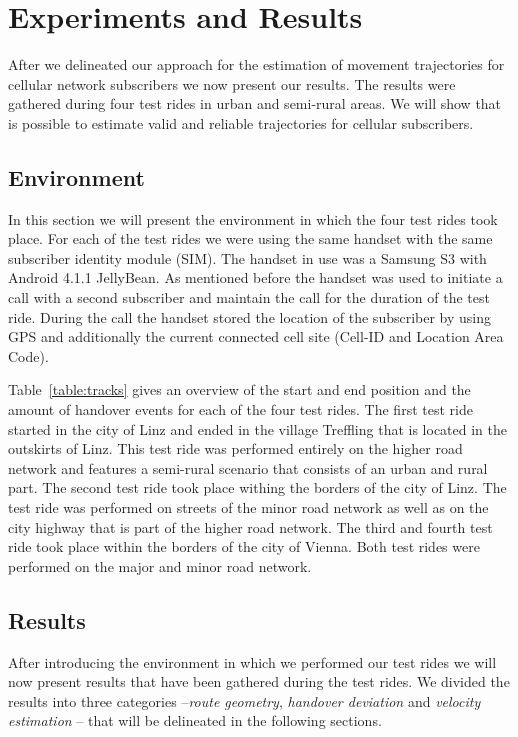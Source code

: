 \documentclass[twocolumn]{bmcart}%
\begin{document}
\section*{Experiments and Results}
\label{sec:results}
After we delineated our approach for the estimation of movement trajectories for cellular network subscribers we now present our results. The results were gathered during four test rides in urban and semi-rural areas. We will show that is possible to estimate valid and reliable trajectories for cellular subscribers.
 
\subsection*{Environment}
In this section we will present the environment in which the four test rides took place. For each of the test rides we were using the same handset with the same subscriber identity module (SIM). The handset in use was a Samsung S3 with Android 4.1.1 JellyBean. As mentioned before the handset was used to initiate a call with a second subscriber and maintain the call for the duration of the test ride. During the call the handset stored the location of the subscriber by using GPS and additionally the current connected cell site (Cell-ID and Location Area Code).

Table~\ref{table:tracks} gives an overview of the start and end position and the amount of handover events for each of the four test rides. The first test ride started in the city of Linz and ended in the village Treffling that is located in the outskirts of Linz. This test ride was performed entirely on the higher road network and features a semi-rural scenario that consists of an urban and rural part. The second test ride took place withing the borders of the city of Linz. The test ride was performed on streets of the minor road network as well as on the city highway that is part of the higher road network. The third and fourth test ride took place within the borders of the city of Vienna. Both test rides were performed on the major and minor road network.
\subsection*{Results}
After introducing the environment in which we performed our test rides we will now present results that have been gathered during the test rides. We divided the results into three categories --\emph{route geometry}, \emph{handover deviation} and \emph{velocity estimation} -- that will be delineated in the following sections.
\end{document}
